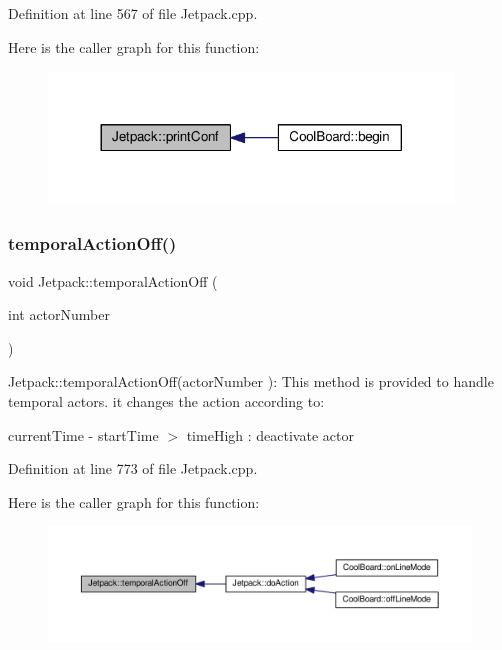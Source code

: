 Definition at line 567 of file Jetpack.\+cpp.

Here is the caller graph for this function\+:\nopagebreak
\begin{figure}[H]
\begin{center}
\leavevmode
\includegraphics[width=305pt]{class_jetpack_ac54a7bb4f9166bee32052253d9b1d306_icgraph}
\end{center}
\end{figure}
\mbox{\label{class_jetpack_a2991b302cd99bf89325f9b66b104d575}} 
\subsubsection{\texorpdfstring{temporal\+Action\+Off()}{temporalActionOff()}}
{\footnotesize\ttfamily void Jetpack\+::temporal\+Action\+Off (\begin{DoxyParamCaption}\item[{int}]{actor\+Number }\end{DoxyParamCaption})}

Jetpack\+::temporal\+Action\+Off(actor\+Number )\+: This method is provided to handle temporal actors. it changes the action according to\+:

current\+Time -\/ start\+Time $>$ time\+High \+: deactivate actor 

Definition at line 773 of file Jetpack.\+cpp.

Here is the caller graph for this function\+:\nopagebreak
\begin{figure}[H]
\begin{center}
\leavevmode
\includegraphics[width=350pt]{class_jetpack_a2991b302cd99bf89325f9b66b104d575_icgraph}
\end{center}
\end{figure}
\mbox{\label{class_jetpack_ad011d904f639accb5f94ef806846ef59}} 
